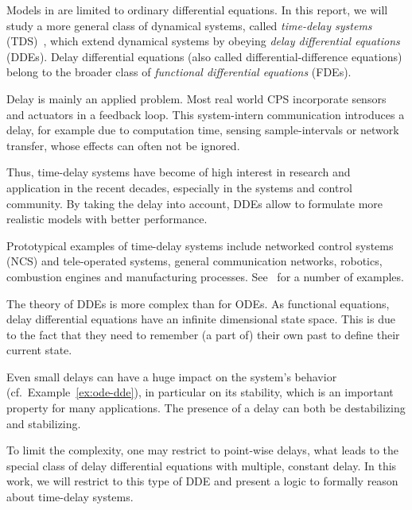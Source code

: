     
    Models in \dL are limited to ordinary differential equations.
    In this report, we will study a more general class of dynamical systems, called \emph{time-delay systems} (TDS)~\cite{Richard2003TDSs}, which extend dynamical systems by obeying \emph{delay differential equations} (DDEs). Delay differential equations (also called differential-difference equations) belong to the broader class of \emph{functional differential equations} (FDEs).

    Delay is mainly an applied problem. Most real world CPS incorporate
    sensors and actuators in a feedback loop. This system-intern communication introduces a delay, for example due to computation time, sensing sample-intervals or network transfer, whose effects can often not be ignored.

    Thus, time-delay systems have become of high interest in research and application in the recent decades, especially in the systems and control community. By taking the delay into account, DDEs allow to formulate more realistic models with better performance.
    
    Prototypical examples of time-delay systems include networked control systems (NCS) and tele-operated systems, general communication networks, robotics, combustion engines and manufacturing processes. See~\cite{Gu03TimeDelaySys} for a number of examples.

    The theory of DDEs is more complex than for ODEs. As functional equations, delay differential equations have an infinite dimensional state space. This is due to the fact that they need to remember (a part of) their own past to define their current state.

    Even small delays can have a huge impact on the system's behavior (cf.\ Example~\ref{ex:ode-dde}), in particular on its stability, which is an important property for many applications.
    The presence of a delay can both be destabilizing and stabilizing.
    


    To limit the complexity, one may restrict to point-wise delays, what leads to the special class of delay differential equations with multiple, constant delay.
    In this work, we will restrict to this type of DDE and present a logic to formally reason about time-delay systems.

